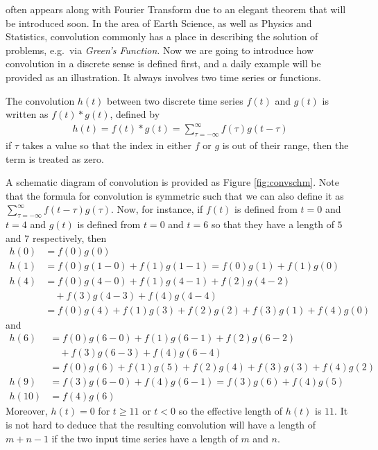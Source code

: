  often appears along with Fourier Transform due to an elegant theorem that will be introduced soon. In the area of Earth Science, as well as Physics and Statistics, convolution commonly has a place in describing the solution of problems, e.g.\ via \textit{Green's Function}. Now we are going to introduce how convolution in a discrete sense is defined first, and a daily example will be provided as an illustration. It always involves two time series or functions.
\begin{defn}
\label{defn:convolution}
The convolution $h(t)$ between two discrete time series $f(t)$ and $g(t)$ is written as $f(t) * g(t)$, defined by
\begin{align}
h(t) = f(t) * g(t) = \sum_{\tau=-\infty}^{\infty} f(\tau) g(t-\tau) \label{eqn:convolutiondefn}
\end{align}
if $\tau$ takes a value so that the index in either $f$ or $g$ is out of their range, then the term is treated as zero.
\end{defn}
A schematic diagram of convolution is provided as Figure \ref{fig:convschm}. Note that the formula for convolution is symmetric such that we can also define it as $\sum_{\tau=-\infty}^{\infty} f(t-\tau) g(\tau)$. Now, for instance, if $f(t)$ is defined from $t = 0$ and $t = 4$ and $g(t)$ is defined from $t = 0$ and $t = 6$ so that they have a length of $5$ and $7$ respectively, then
\begin{align*}
h(0) &= f(0)g(0) \\
h(1) &= f(0)g(1-0) + f(1)g(1-1) = f(0)g(1) + f(1)g(0) \\
h(4) &= f(0)g(4-0) + f(1)g(4-1) + f(2)g(4-2) \\
&\quad + f(3)g(4-3) + f(4)g(4-4) \\
&= f(0)g(4) + f(1)g(3) + f(2)g(2) + f(3)g(1) + f(4)g(0)
\end{align*}
and
\begin{align*}
h(6) &= f(0)g(6-0) + f(1)g(6-1) + f(2)g(6-2) \\
&\quad + f(3)g(6-3) + f(4)g(6-4) \\
&= f(0)g(6) + f(1)g(5) + f(2)g(4) + f(3)g(3) + f(4)g(2) \\
h(9) &=  f(3)g(6-0) + f(4)g(6-1) = f(3)g(6) + f(4)g(5) \\
h(10) &= f(4)g(6)
\end{align*}
Moreover, $h(t) = 0$ for $t \geq 11$ or $t < 0$ so the effective length of $h(t)$ is $11$. It is not hard to deduce that the resulting convolution will have a length of $m + n - 1$ if the two input time series have a length of $m$ and $n$.

